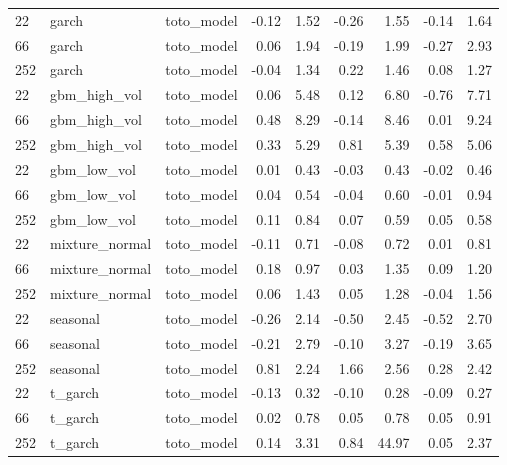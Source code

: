 {\begin{tabular}{lllrrrrrr}
\midrule
22 & garch & toto\_model & -0.12 & 1.52 & -0.26 & 1.55 & -0.14 & 1.64 \\
66 & garch & toto\_model & 0.06 & 1.94 & -0.19 & 1.99 & -0.27 & 2.93 \\
252 & garch & toto\_model & -0.04 & 1.34 & 0.22 & 1.46 & 0.08 & 1.27 \\
\midrule
22 & gbm\_high\_vol & toto\_model & 0.06 & 5.48 & 0.12 & 6.80 & -0.76 & 7.71 \\
66 & gbm\_high\_vol & toto\_model & 0.48 & 8.29 & -0.14 & 8.46 & 0.01 & 9.24 \\
252 & gbm\_high\_vol & toto\_model & 0.33 & 5.29 & 0.81 & 5.39 & 0.58 & 5.06 \\
\midrule
22 & gbm\_low\_vol & toto\_model & 0.01 & 0.43 & -0.03 & 0.43 & -0.02 & 0.46 \\
66 & gbm\_low\_vol & toto\_model & 0.04 & 0.54 & -0.04 & 0.60 & -0.01 & 0.94 \\
252 & gbm\_low\_vol & toto\_model & 0.11 & 0.84 & 0.07 & 0.59 & 0.05 & 0.58 \\
\midrule
22 & mixture\_normal & toto\_model & -0.11 & 0.71 & -0.08 & 0.72 & 0.01 & 0.81 \\
66 & mixture\_normal & toto\_model & 0.18 & 0.97 & 0.03 & 1.35 & 0.09 & 1.20 \\
252 & mixture\_normal & toto\_model & 0.06 & 1.43 & 0.05 & 1.28 & -0.04 & 1.56 \\
\midrule
22 & seasonal & toto\_model & -0.26 & 2.14 & -0.50 & 2.45 & -0.52 & 2.70 \\
66 & seasonal & toto\_model & -0.21 & 2.79 & -0.10 & 3.27 & -0.19 & 3.65 \\
252 & seasonal & toto\_model & 0.81 & 2.24 & 1.66 & 2.56 & 0.28 & 2.42 \\
\midrule
22 & t\_garch & toto\_model & -0.13 & 0.32 & -0.10 & 0.28 & -0.09 & 0.27 \\
66 & t\_garch & toto\_model & 0.02 & 0.78 & 0.05 & 0.78 & 0.05 & 0.91 \\
252 & t\_garch & toto\_model & 0.14 & 3.31 & 0.84 & 44.97 & 0.05 & 2.37 \\
\bottomrule
\end{tabular}
}